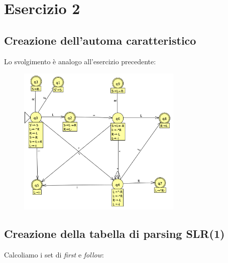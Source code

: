 \documentclass[11pt]{article}
\begin{document}
\newpage
\section{Esercizio 2}
\subsection{Creazione dell'automa caratteristico}
Lo svolgimento è analogo all'esercizio precedente:

\begin{figure}[H]
  \centering
  \includegraphics[width=0.7\textwidth]{img/02AutomaSRL.png}
  \label{fig:02-automa}
\end{figure}

\subsection{Creazione della tabella di parsing SLR(1)}
Calcoliamo i set di \textit{first} e \textit{follow}:
\end{document}
